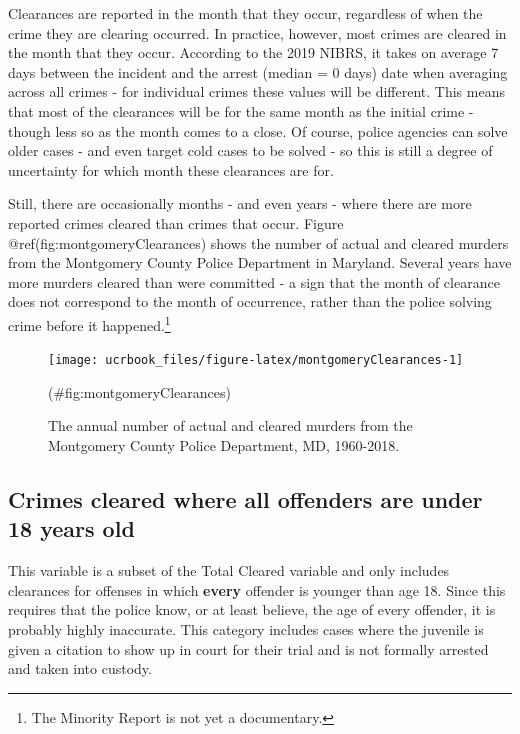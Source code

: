 \documentclass[
  12pt,
  openany]{book}
\begin{document}
Clearances are reported in the month that they occur, regardless of when the crime they are clearing occurred. In practice, however, most crimes are cleared in the month that they occur. According to the 2019 NIBRS, it takes on average 7 days between the incident and the arrest (median = 0 days) date when averaging across all crimes - for individual crimes these values will be different. This means that most of the clearances will be for the same month as the initial crime - though less so as the month comes to a close. Of course, police agencies can solve older cases - and even target cold cases to be solved - so this is still a degree of uncertainty for which month these clearances are for.

Still, there are occasionally months - and even years - where there are more reported crimes cleared than crimes that occur. Figure @ref(fig:montgomeryClearances) shows the number of actual and cleared murders from the Montgomery County Police Department in Maryland. Several years have more murders cleared than were committed - a sign that the month of clearance does not correspond to the month of occurrence, rather than the police solving crime before it happened.\footnote{The Minority Report is not yet a documentary.}

\begin{figure}

{\centering \texttt{[image: ucrbook\_files/figure-latex/montgomeryClearances-1]} 

}

\caption{The annual number of actual and cleared murders from the Montgomery County Police Department, MD, 1960-2018.}(\#fig:montgomeryClearances)
\end{figure}

\hypertarget{crimes-cleared-where-all-offenders-are-under-18-years-old}{%
\subsection{Crimes cleared where all offenders are under 18 years old}\label{crimes-cleared-where-all-offenders-are-under-18-years-old}}

This variable is a subset of the Total Cleared variable and only includes clearances for offenses in which \textbf{every} offender is younger than age 18. Since this requires that the police know, or at least believe, the age of every offender, it is probably highly inaccurate. This category includes cases where the juvenile is given a citation to show up in court for their trial and is not formally arrested and taken into custody.
\end{document}
